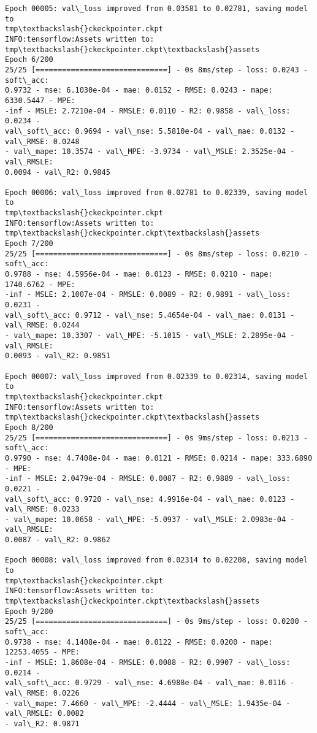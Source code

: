 \documentclass[11pt]{article}
\begin{document}
\begin{Verbatim}[commandchars=\\\{\}]
Epoch 00005: val\_loss improved from 0.03581 to 0.02781, saving model to
tmp\textbackslash{}ckeckpointer.ckpt
INFO:tensorflow:Assets written to: tmp\textbackslash{}ckeckpointer.ckpt\textbackslash{}assets
Epoch 6/200
25/25 [==============================] - 0s 8ms/step - loss: 0.0243 - soft\_acc:
0.9732 - mse: 6.1030e-04 - mae: 0.0152 - RMSE: 0.0243 - mape: 6330.5447 - MPE:
-inf - MSLE: 2.7210e-04 - RMSLE: 0.0110 - R2: 0.9858 - val\_loss: 0.0234 -
val\_soft\_acc: 0.9694 - val\_mse: 5.5810e-04 - val\_mae: 0.0132 - val\_RMSE: 0.0248
- val\_mape: 10.3574 - val\_MPE: -3.9734 - val\_MSLE: 2.3525e-04 - val\_RMSLE:
0.0094 - val\_R2: 0.9845

Epoch 00006: val\_loss improved from 0.02781 to 0.02339, saving model to
tmp\textbackslash{}ckeckpointer.ckpt
INFO:tensorflow:Assets written to: tmp\textbackslash{}ckeckpointer.ckpt\textbackslash{}assets
Epoch 7/200
25/25 [==============================] - 0s 8ms/step - loss: 0.0210 - soft\_acc:
0.9788 - mse: 4.5956e-04 - mae: 0.0123 - RMSE: 0.0210 - mape: 1740.6762 - MPE:
-inf - MSLE: 2.1007e-04 - RMSLE: 0.0089 - R2: 0.9891 - val\_loss: 0.0231 -
val\_soft\_acc: 0.9712 - val\_mse: 5.4654e-04 - val\_mae: 0.0131 - val\_RMSE: 0.0244
- val\_mape: 10.3307 - val\_MPE: -5.1015 - val\_MSLE: 2.2895e-04 - val\_RMSLE:
0.0093 - val\_R2: 0.9851

Epoch 00007: val\_loss improved from 0.02339 to 0.02314, saving model to
tmp\textbackslash{}ckeckpointer.ckpt
INFO:tensorflow:Assets written to: tmp\textbackslash{}ckeckpointer.ckpt\textbackslash{}assets
Epoch 8/200
25/25 [==============================] - 0s 9ms/step - loss: 0.0213 - soft\_acc:
0.9790 - mse: 4.7408e-04 - mae: 0.0121 - RMSE: 0.0214 - mape: 333.6890 - MPE:
-inf - MSLE: 2.0479e-04 - RMSLE: 0.0087 - R2: 0.9889 - val\_loss: 0.0221 -
val\_soft\_acc: 0.9720 - val\_mse: 4.9916e-04 - val\_mae: 0.0123 - val\_RMSE: 0.0233
- val\_mape: 10.0658 - val\_MPE: -5.0937 - val\_MSLE: 2.0983e-04 - val\_RMSLE:
0.0087 - val\_R2: 0.9862

Epoch 00008: val\_loss improved from 0.02314 to 0.02208, saving model to
tmp\textbackslash{}ckeckpointer.ckpt
INFO:tensorflow:Assets written to: tmp\textbackslash{}ckeckpointer.ckpt\textbackslash{}assets
Epoch 9/200
25/25 [==============================] - 0s 9ms/step - loss: 0.0200 - soft\_acc:
0.9738 - mse: 4.1408e-04 - mae: 0.0122 - RMSE: 0.0200 - mape: 12253.4055 - MPE:
-inf - MSLE: 1.8608e-04 - RMSLE: 0.0088 - R2: 0.9907 - val\_loss: 0.0214 -
val\_soft\_acc: 0.9729 - val\_mse: 4.6988e-04 - val\_mae: 0.0116 - val\_RMSE: 0.0226
- val\_mape: 7.4660 - val\_MPE: -2.4444 - val\_MSLE: 1.9435e-04 - val\_RMSLE: 0.0082
- val\_R2: 0.9871


\end{Verbatim}
\end{document}
